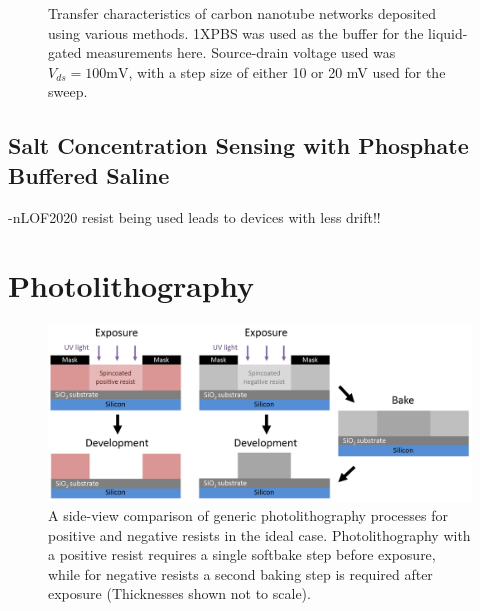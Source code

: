 \documentclass[
  a4paper,
]{scrbook}
\begin{document}
\begin{figure}
\begin{minipage}[t]{0.49\linewidth}
{{}

}

\end{minipage}%

\caption{\label{fig-pristine-cnt-characteristics}Transfer
characteristics of carbon nanotube networks deposited using various
methods. 1XPBS was used as the buffer for the liquid-gated measurements
here. Source-drain voltage used was \(V_{ds} = 100 \textrm{mV}\), with a
step size of either 10 or 20 mV used for the sweep.}

\end{figure}

\hypertarget{sec-dummy-sensing}{%
\section{Salt Concentration Sensing with Phosphate Buffered
Saline}\label{sec-dummy-sensing}}

-nLOF2020 resist being used leads to devices with less drift!!

\appendix
{}

\hypertarget{sec-photolithography}{%
\chapter{Photolithography}\label{sec-photolithography}}

\begin{figure}

{\centering \includegraphics{./figures/app1/positive-negative-photolithography.png}

}

\caption{\label{fig-photolithography-types}A side-view comparison of
generic photolithography processes for positive and negative resists in
the ideal case. Photolithography with a positive resist requires a
single softbake step before exposure, while for negative resists a
second baking step is required after exposure (Thicknesses shown not to
scale).}

\end{figure}
\end{document}
